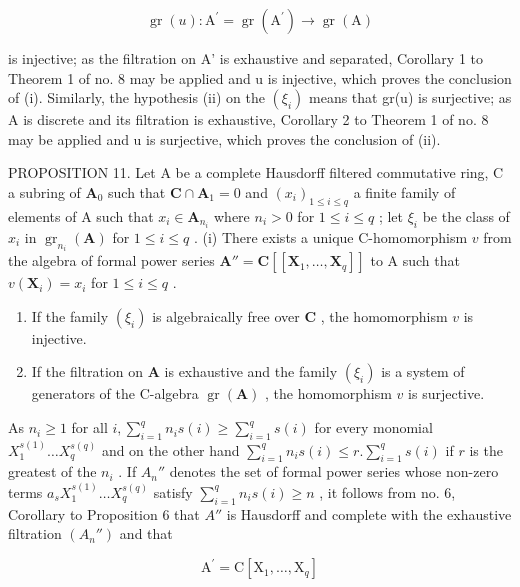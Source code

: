 \[
\operatorname{gr} (u): \mathrm{A} ^ {\prime} = \operatorname{gr} (\mathrm{A} ^ {\prime}) \rightarrow \operatorname{gr} (\mathrm{A})
\]

is injective; as the filtration on A' is exhaustive and separated, Corollary 1 to Theorem 1 of no. 8 may be applied and u is injective, which proves the conclusion of (i). Similarly, the hypothesis (ii) on the \((\xi_{i})\) means that gr(u) is surjective; as A is discrete and its filtration is exhaustive, Corollary 2 to Theorem 1 of no. 8 may be applied and u is surjective, which proves the conclusion of (ii).

PROPOSITION 11. Let A be a complete Hausdorff filtered commutative ring, C a subring of \(\mathbf{A}_0\) such that \(\mathbf{C} \cap \mathbf{A}_1 = 0\) and \((x_i)_{1 \leqslant i \leqslant q}\) a finite family of elements of A such that \(x_i \in \mathbf{A}_{n_i}\) where \(n_i > 0\) for \(1 \leqslant i \leqslant q\) ; let \(\xi_i\) be the class of \(x_i\) in \(\operatorname{gr}_{n_i}(\mathbf{A})\) for \(1 \leqslant i \leqslant q\) . (i) There exists a unique C-homomorphism \(v\) from the algebra of formal power series \(\mathbf{A}'' = \mathbf{C}[[\mathbf{X}_1, \ldots, \mathbf{X}_q]]\) to A such that \(v(\mathbf{X}_i) = x_i\) for \(1 \leqslant i \leqslant q\) .

\begin{enumerate}
\def\labelenumi{(\roman{enumi})}
\setcounter{enumi}{1}
\item
  If the family \((\xi_{i})\) is algebraically free over \(\mathbf{C}\) , the homomorphism \(v\) is injective.
\item
  If the filtration on \(\mathbf{A}\) is exhaustive and the family \((\xi_{i})\) is a system of generators of the C-algebra \(\operatorname{gr}(\mathbf{A})\) , the homomorphism \(v\) is surjective.
\end{enumerate}

As \(n_i \geqslant 1\) for all \(i, \sum_{i=1}^{q} n_i s(i) \geqslant \sum_{i=1}^{q} s(i)\) for every monomial \(X_1^{s(1)} \ldots X_q^{s(q)}\) and on the other hand \(\sum_{i=1}^{q} n_i s(i) \leqslant r. \sum_{i=1}^{q} s(i)\) if \(r\) is the greatest of the \(n_i\) . If \(A_n''\) denotes the set of formal power series whose non-zero terms \(a_s X_1^{s(1)} \ldots X_q^{s(q)}\) satisfy \(\sum_{i=1}^{q} n_i s(i) \geqslant n\) , it follows from no. 6, Corollary to Proposition 6 that \(A''\) is Hausdorff and complete with the exhaustive filtration \((A_n'')\) and that

\[
\mathrm{A} ^ {\prime} = \mathrm{C} [ \mathrm{X} _ {1}, \dots , \mathrm{X} _ {q} ]
\]

